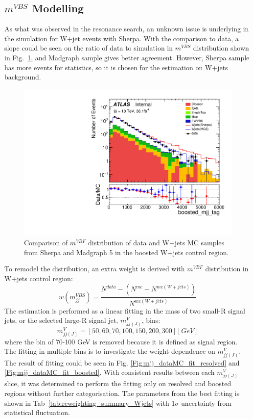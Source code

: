 \subsection{$m^{VBS}$ Modelling}
As what was observed in the resonance search, an unknown issue is underlying in the simulation for W+jet events with Sherpa. With the comparison to data, a slope could be seen on the ratio of data to simulation in $m^{VBS}$ distribution shown in Fig.~\ref{Fig:mtagmis}, and Madgraph sample gives better agreement. However, Sherpa sample has more events for statistics, so it is chosen for the estimation on W+jets background. 
\begin{figure}
	\begin{center}
		\includegraphics[width=0.6\linewidth]{Chapter5/boosted_mjj_tag.pdf}
	\end{center}
	\caption[]{
		Comparison of $m^{VBF}$ distribution of data and W+jets MC samples from Sherpa and Madgraph 5 in the boosted W+jets control region.
	}    
	\label{Fig:mtagmis}
\end{figure}
\noindent
To remodel the distribution, an extra weight is derived with $m^{VBF}$ distribution in W+jets control region:
\begin{equation}
w(m^{VBS}_{jj}) = \frac{N^{data}-(N^{mc}-N^{mc( W+jets)})}{N^{mc( W+jets)}} 
\end{equation}  
The estimation is performed as a linear fitting in the mass of two small-R signal jets, or the selected large-R signal jet, $m_{jj(J)}^{V}$, bins:
\begin{equation}
m_{jj(J)}^{V} = [50,60,70,100,150,200,300] [GeV]
\end{equation}  
where the bin of 70-100 GeV is removed because it is defined as signal region. The fitting in multiple bins is to investigate the weight dependence on  $m_{jj(J)}^{V}$. The result of fitting could be seen in Fig. \ref{Fig:mjj_dataMC_fit_resolved} and \ref{Fig:mjj_dataMC_fit_boosted}. With consistent results between each $m_{jj(J)}^{V}$ slice, it was determined to perform the fitting only on resolved and boosted regions without further categorisation. The parameters from the best fitting is shown in Tab~\ref{tab:reweighting_summary_Wjets} with $1\sigma$ uncertainty from statistical fluctuation. 
